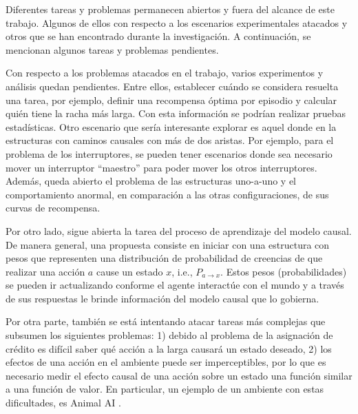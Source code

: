 Diferentes tareas y problemas permanecen abiertos y fuera del alcance de este trabajo. Algunos de ellos con respecto a los escenarios experimentales atacados  y otros que se han encontrado durante la investigación. A continuación, se 
mencionan algunos tareas y problemas pendientes.

Con respecto a los problemas atacados en el trabajo,
varios experimentos y análisis quedan pendientes. Entre ellos, 
establecer cuándo se considera resuelta una tarea, por ejemplo, 
definir una recompensa óptima por episodio y 
calcular quién tiene la racha más larga. Con esta información 
se podrían realizar pruebas estadísticas. Otro escenario que sería interesante
explorar es aquel donde en la estructuras con caminos causales con más de dos aristas. Por ejemplo, para el problema de los interruptores, se pueden
tener escenarios donde sea necesario mover un interruptor ``maestro'' para
poder mover los otros interruptores. Además, queda abierto el problema
de las estructuras uno-a-uno y el comportamiento anormal, en comparación
a las otras configuraciones, de sus curvas de recompensa.

Por otro lado, sigue abierta la tarea del proceso de aprendizaje del modelo
causal. De manera general, una propuesta consiste en iniciar con una estructura con pesos que representen 
una distribución de probabilidad de creencias de que realizar una acción $a$ cause un estado $x$, i.e., $P_{a\rightarrow x}$. Estos pesos (probabilidades) se pueden
ir actualizando conforme el agente interactúe con el mundo y
a través de sus respuestas le brinde información del modelo causal que lo gobierna.


Por otra parte, también se está intentando atacar tareas más 
complejas que subsumen los siguientes problemas: 1) debido al problema de la asignación de crédito es difícil saber qué acción a la larga causará un estado deseado, 2) los efectos de una acción en el ambiente puede ser imperceptibles, por lo que es necesario medir el efecto causal de una acción sobre un estado una función similar a una función de valor. En particular, un ejemplo de un ambiente con estas dificultades, es Animal AI \cite{beyret2019animalai}.


